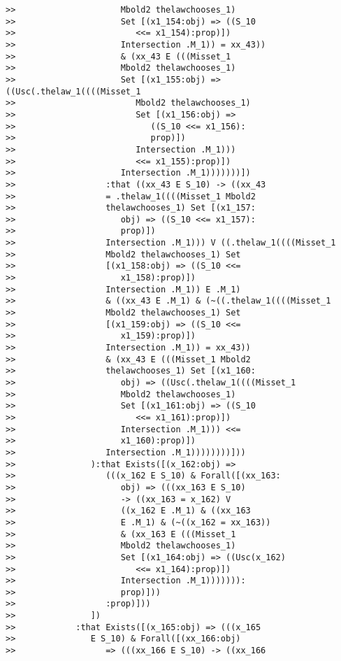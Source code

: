 \documentclass[12pt]{article}
\begin{document}
\begin{verbatim}
>>                     Mbold2 thelawchooses_1)
>>                     Set [(x1_154:obj) => ((S_10
>>                        <<= x1_154):prop)])
>>                     Intersection .M_1)) = xx_43))
>>                     & (xx_43 E (((Misset_1
>>                     Mbold2 thelawchooses_1)
>>                     Set [(x1_155:obj) => ((Usc(.thelaw_1((((Misset_1
>>                        Mbold2 thelawchooses_1)
>>                        Set [(x1_156:obj) =>
>>                           ((S_10 <<= x1_156):
>>                           prop)])
>>                        Intersection .M_1)))
>>                        <<= x1_155):prop)])
>>                     Intersection .M_1)))))))])
>>                  :that ((xx_43 E S_10) -> ((xx_43
>>                  = .thelaw_1((((Misset_1 Mbold2
>>                  thelawchooses_1) Set [(x1_157:
>>                     obj) => ((S_10 <<= x1_157):
>>                     prop)])
>>                  Intersection .M_1))) V ((.thelaw_1((((Misset_1
>>                  Mbold2 thelawchooses_1) Set
>>                  [(x1_158:obj) => ((S_10 <<=
>>                     x1_158):prop)])
>>                  Intersection .M_1)) E .M_1)
>>                  & ((xx_43 E .M_1) & (~((.thelaw_1((((Misset_1
>>                  Mbold2 thelawchooses_1) Set
>>                  [(x1_159:obj) => ((S_10 <<=
>>                     x1_159):prop)])
>>                  Intersection .M_1)) = xx_43))
>>                  & (xx_43 E (((Misset_1 Mbold2
>>                  thelawchooses_1) Set [(x1_160:
>>                     obj) => ((Usc(.thelaw_1((((Misset_1
>>                     Mbold2 thelawchooses_1)
>>                     Set [(x1_161:obj) => ((S_10
>>                        <<= x1_161):prop)])
>>                     Intersection .M_1))) <<=
>>                     x1_160):prop)])
>>                  Intersection .M_1))))))))]))
>>               ):that Exists([(x_162:obj) =>
>>                  (((x_162 E S_10) & Forall([(xx_163:
>>                     obj) => (((xx_163 E S_10)
>>                     -> ((xx_163 = x_162) V
>>                     ((x_162 E .M_1) & ((xx_163
>>                     E .M_1) & (~((x_162 = xx_163))
>>                     & (xx_163 E (((Misset_1
>>                     Mbold2 thelawchooses_1)
>>                     Set [(x1_164:obj) => ((Usc(x_162)
>>                        <<= x1_164):prop)])
>>                     Intersection .M_1))))))):
>>                     prop)]))
>>                  :prop)]))
>>               ])
>>            :that Exists([(x_165:obj) => (((x_165
>>               E S_10) & Forall([(xx_166:obj)
>>                  => (((xx_166 E S_10) -> ((xx_166

\end{verbatim}
\end{document}
